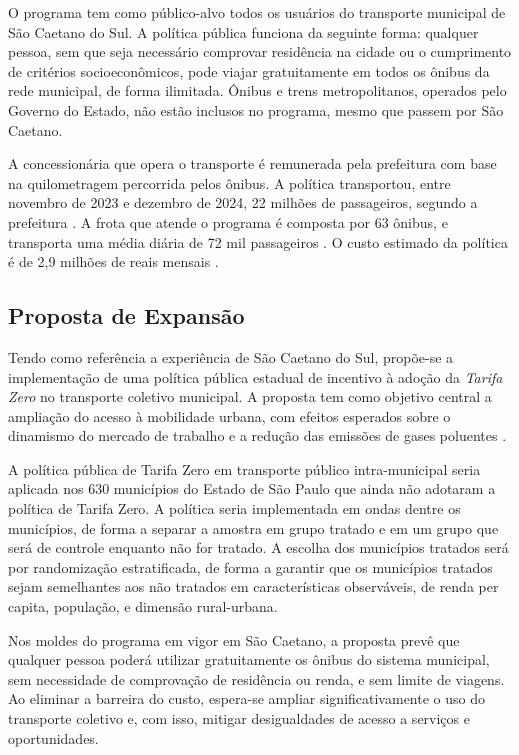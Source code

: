 O programa tem como público-alvo todos os usuários do transporte municipal de São Caetano do Sul. A política pública funciona da seguinte forma: qualquer pessoa, sem que seja necessário comprovar residência na cidade ou o cumprimento de critérios socioeconômicos, pode viajar gratuitamente em todos os ônibus da rede municipal, de forma ilimitada. Ônibus e trens metropolitanos, operados pelo Governo do Estado, não estão inclusos no programa, mesmo que passem por São Caetano.

A concessionária que opera o transporte é remunerada pela prefeitura com base na quilometragem percorrida pelos ônibus. A política transportou, entre novembro de 2023 e dezembro de 2024, 22 milhões de passageiros, segundo a prefeitura \cite{PREF_2024}. A frota que atende o programa é composta por 63 ônibus, e transporta uma média diária de 72 mil passageiros \cite{PREF_2023}. O custo estimado da política é de 2{,}9 milhões de reais mensais \cite{LEI_PROG}.

\subsection{Proposta de Expansão}

Tendo como referência a experiência de São Caetano do Sul, propõe-se a implementação de uma política pública estadual de incentivo à adoção da \textit{Tarifa Zero} no transporte coletivo municipal. A proposta tem como objetivo central a ampliação do acesso à mobilidade urbana, com efeitos esperados sobre o dinamismo do mercado de trabalho e a redução das emissões de gases poluentes \cite{BETTER_FIRMS, NO_DAM, PREF_2024}.

A política pública de Tarifa Zero em transporte público intra-municipal seria aplicada nos 630 municípios do Estado de São Paulo que ainda não adotaram a política de Tarifa Zero. A política seria implementada em ondas dentre os municípios, de forma a separar a amostra em grupo tratado e em um grupo que será de controle enquanto não for tratado. A escolha dos municípios tratados será por randomização estratificada, de forma a garantir que os municípios tratados sejam semelhantes aos não tratados em características observáveis, de renda per capita, população, e dimensão rural-urbana.

Nos moldes do programa em vigor em São Caetano, a proposta prevê que qualquer pessoa poderá utilizar gratuitamente os ônibus do sistema municipal, sem necessidade de comprovação de residência ou renda, e sem limite de viagens. Ao eliminar a barreira do custo, espera-se ampliar significativamente o uso do transporte coletivo e, com isso, mitigar desigualdades de acesso a serviços e oportunidades.

